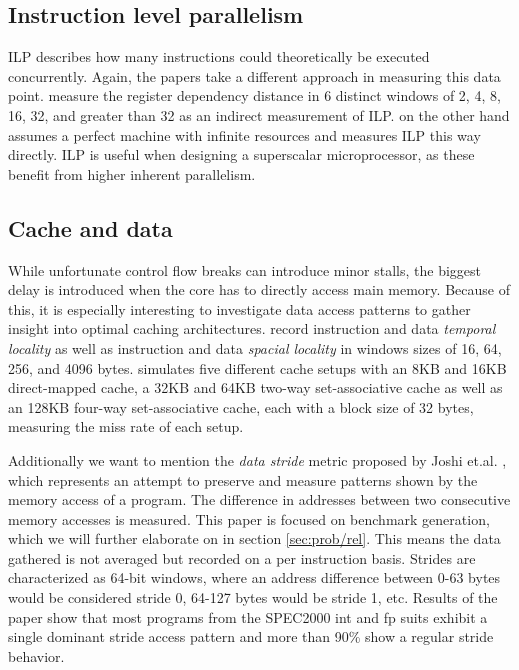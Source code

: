 \documentclass[../bachelor_paper.tex]{subfiles}
\begin{document}
\subsection{Instruction level parallelism}
\Acf{ILP} describes how many instructions could theoretically be executed concurrently. Again, the papers take a different approach in measuring this data point. \cite{phansalkarMeasuringProgramSimilarity2005,joshiMeasuringBenchmarkSimilarity2006} measure the register dependency distance in 6 distinct windows of 2, 4, 8, 16, 32, and greater than 32 as an indirect measurement of \ac{ILP}. \cite{eeckhoutQuantifyingImpactInput2003} on the other hand assumes a perfect machine with infinite resources and measures \ac{ILP} this way directly. \Ac{ILP} is useful when designing a superscalar microprocessor, as these benefit from higher inherent parallelism.

\subsection{Cache and data}
While unfortunate control flow breaks can introduce minor stalls, the biggest delay is introduced when the core has to directly access main memory. Because of this, it is especially interesting to investigate data access patterns to gather insight into optimal caching architectures. \cite{phansalkarMeasuringProgramSimilarity2005,joshiMeasuringBenchmarkSimilarity2006} record instruction and data \emph{temporal locality} as well as instruction and data \emph{spacial locality} in windows sizes of 16, 64, 256, and 4096 bytes. \cite{eeckhoutQuantifyingImpactInput2003} simulates five different cache setups with an 8KB and 16KB direct-mapped cache, a 32KB and 64KB two-way set-associative cache as well as an 128KB four-way set-associative cache, each with a block size of 32 bytes, measuring the miss rate of each setup.

Additionally we want to mention the \emph{data stride} metric proposed by Joshi et.al. \cite{joshiDistillingEssenceProprietary2008}, which represents an attempt to preserve and measure patterns shown by the memory access of a program. The difference in addresses between two consecutive memory accesses is measured. This paper is focused on benchmark generation, which we will further elaborate on in section \ref{sec:prob/rel}. This means the data gathered is not averaged but recorded on a per instruction basis. Strides are characterized as 64-bit windows, where an address difference between 0-63 bytes would be considered stride 0, 64-127 bytes would be stride 1, etc. Results of the paper show that most programs from the \acs{SPEC}2000 int and fp suits exhibit a single dominant stride access pattern and more than 90\% show a regular stride behavior.
\end{document}
